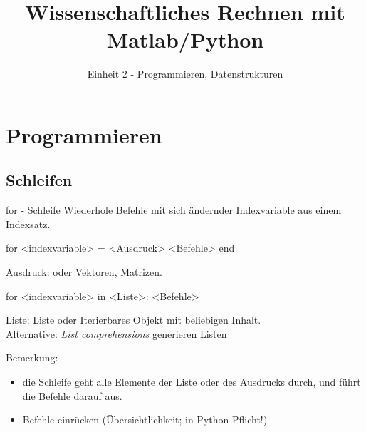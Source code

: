 \documentclass[hyperref={xetex}]{beamer}
\title{Wissenschaftliches Rechnen mit Matlab/Python}
\subtitle{Einheit 2 - Programmieren, Datenstrukturen}
\begin{document}
\titlepage




\section{Programmieren}
 

\subsection{Schleifen}
%
%
\begin{frame}[fragile]{for - Schleife}
Wiederhole Befehle mit sich ändernder Indexvariable aus einem Indexsatz. 
\begin{matlabin}
for <indexvariable> = <Ausdruck>
  <Befehle>
end
\end{matlabin}
Ausdruck:  oder Vektoren, Matrizen. 
\begin{pyin}
for <indexvariable> in <Liste>:
  <Befehle>
\end{pyin}
Liste: Liste oder Iterierbares Objekt mit beliebigen Inhalt.\\
Alternative: \textsl{List comprehensions} generieren Listen
  \begin{pyin}
\end{pyin}
\alert{Bemerkung:} 
\begin{itemize}
\item die Schleife geht alle Elemente der Liste oder des Ausdrucks durch, und führt die Befehle 
  darauf aus. 
\item \alert{Befehle} einrücken (Übersichtlichkeit; in Python Pflicht!) 
\end{itemize}

\end{frame}

% 
\end{document}
